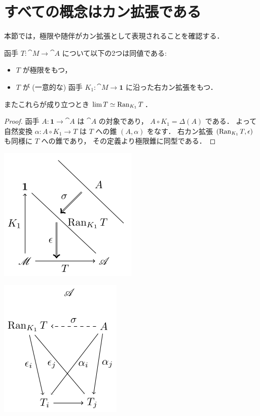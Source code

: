 \documentclass[titlepage]{ltjsreport}
\newtheorem[S]{theorem}{定理}[chapter]
\newtheorem[S]{definition}[theorem]{定義}
\newtheorem[S]{example}[theorem]{例}
\begin{document}
\section{すべての概念はカン拡張である}

本節では，極限や随伴がカン拡張として表現されることを確認する．

\begin{theorem}[極限は右カン拡張である]\label{thm:limit-is-right-kan-extension}
  函手 $T:\cat{M}\to\cat{A}$ について以下の2つは同値である:
  \begin{itemize}
    \item $T$ が極限をもつ，
    \item $T$ が (一意的な) 函手 $K_1:\cat{M}\to\mathbf{1}$
          に沿った右カン拡張をもつ．
  \end{itemize}
  またこれらが成り立つとき $\lim T\simeq\operatorname{Ran}_{K_1}T$．
\end{theorem}

\begin{proof}
  函手 $A:\mathbf{1}\to\cat{A}$ は $\cat{A}$ の対象であり，
  $A\circ K_1=\Delta(A)$ である．
  よって自然変換 $\alpha:A\circ K_1\to T$ は $T$ への錐 $(A,\alpha)$ をなす．
  右カン拡張 $(\operatorname{Ran}_{K_1}T,\epsilon)$ も同様に $T$ への錐であり，
  その定義より極限錐に同型である．
\end{proof}

\begin{center}
  \begin{minipage}[b]{0.4\linewidth}
    \includegraphics{src/lim-right-kan-1}
  \end{minipage}
  \begin{minipage}[b]{0.4\linewidth}
    \includegraphics{src/lim-right-kan-2}
  \end{minipage}
\end{center}
\end{document}
